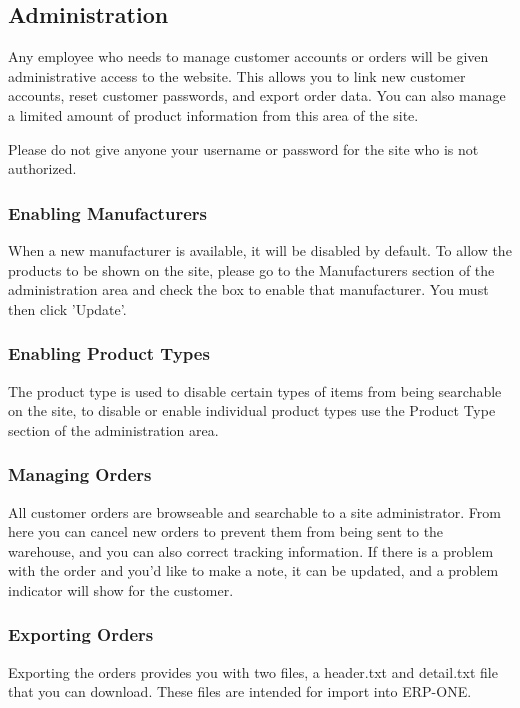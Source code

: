 \subsection{Administration}

Any employee who needs to manage customer accounts or orders will be given administrative access to the website. This allows you to link new customer accounts, reset customer passwords, and export order data.  You can also manage a limited amount of product information from this area of the site.

Please do not give anyone your username or password for the site who is not authorized.

\subsubsection{Enabling Manufacturers}

When a new manufacturer is available, it will be disabled by default.  To allow the products to be shown on the site, please go to the Manufacturers section of the administration area and check the box to enable that manufacturer.  You must then click 'Update'.

\subsubsection{Enabling Product Types}

The product type is used to disable certain types of items from being searchable on the site, to disable or enable individual product types use the Product Type section of the administration area.

\subsubsection{Managing Orders}

All customer orders are browseable and searchable to a site administrator. From here you can cancel new orders to prevent them from being sent to the warehouse, and you can also correct tracking information.  If there is a problem with the order and you'd like to make a note, it can be updated, and a problem indicator will show for the customer.

\subsubsection{Exporting Orders}

Exporting the orders provides you with two files, a header.txt and detail.txt file that you can download.  These files are intended for import into ERP-ONE.

